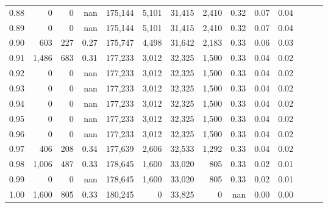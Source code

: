 \begin{tabular}{rrrrrrrrrrrrrr}
0.88 &       0 &      0 &   nan &  175,144 &    5,101 &  31,415 &   2,410 &  0.32 &  0.07 &      0.04 \\
0.89 &       0 &      0 &   nan &  175,144 &    5,101 &  31,415 &   2,410 &  0.32 &  0.07 &      0.04 \\
0.90 &     603 &    227 &  0.27 &  175,747 &    4,498 &  31,642 &   2,183 &  0.33 &  0.06 &      0.03 \\
0.91 &   1,486 &    683 &  0.31 &  177,233 &    3,012 &  32,325 &   1,500 &  0.33 &  0.04 &      0.02 \\
0.92 &       0 &      0 &   nan &  177,233 &    3,012 &  32,325 &   1,500 &  0.33 &  0.04 &      0.02 \\
0.93 &       0 &      0 &   nan &  177,233 &    3,012 &  32,325 &   1,500 &  0.33 &  0.04 &      0.02 \\
0.94 &       0 &      0 &   nan &  177,233 &    3,012 &  32,325 &   1,500 &  0.33 &  0.04 &      0.02 \\
0.95 &       0 &      0 &   nan &  177,233 &    3,012 &  32,325 &   1,500 &  0.33 &  0.04 &      0.02 \\
0.96 &       0 &      0 &   nan &  177,233 &    3,012 &  32,325 &   1,500 &  0.33 &  0.04 &      0.02 \\
0.97 &     406 &    208 &  0.34 &  177,639 &    2,606 &  32,533 &   1,292 &  0.33 &  0.04 &      0.02 \\
0.98 &   1,006 &    487 &  0.33 &  178,645 &    1,600 &  33,020 &     805 &  0.33 &  0.02 &      0.01 \\
0.99 &       0 &      0 &   nan &  178,645 &    1,600 &  33,020 &     805 &  0.33 &  0.02 &      0.01 \\
1.00 &   1,600 &    805 &  0.33 &  180,245 &        0 &  33,825 &       0 &   nan &  0.00 &      0.00 \\
\bottomrule
\end{tabular}
